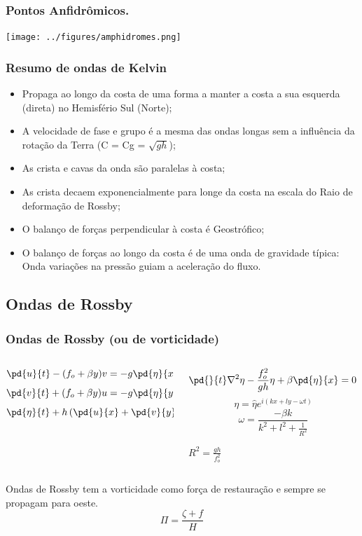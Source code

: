 \begin{frame}
  \frametitle{Pontos Anfidrômicos.}
  \begin{center}
    \texttt{[image: ../figures/amphidromes.png]}
  \end{center}
\end{frame}


\begin{frame}
  \frametitle{Resumo de ondas de Kelvin}
\small{
  \begin{itemize}[<+-| alert@+>]
  \item Propaga ao longo da costa de uma forma a manter a costa
        a sua esquerda (direta) no Hemisfério Sul (Norte);
  \item A velocidade de fase e grupo é a mesma das ondas longas
        sem a influência da rotação da Terra (C = Cg = $\sqrt{gh}$);
  \item As crista e cavas da onda são paralelas à costa;
  \item As crista decaem exponencialmente para longe da costa na escala do Raio
        de deformação de Rossby;
  \item O balanço de forças perpendicular à costa é Geostrófico;
  \item O balanço de forças ao longo da costa é de uma onda de gravidade típica:
      Onda variações na pressão guiam a aceleração do fluxo.
  \end{itemize}
}
\end{frame}


\subsection{Ondas de Rossby}
\begin{frame}
  \frametitle{Ondas de Rossby (ou de vorticidade)}
{\scriptsize
  \begin{columns}
    \begin{column}{0.5\textwidth}
    \begin{block}{}
      \[
        \pd{u}{t} - (f_o + \beta y)v = - g\pd{\eta}{x}
      \]
      \[
        \pd{v}{t} + (f_o + \beta y)u = - g\pd{\eta}{y}
      \]
      \[
        \pd{\eta}{t} + h\left(\pd{u}{x} + \pd{v}{y}\right)= 0
      \]
    \end{block}
    \end{column}
    \begin{column}{0.5\textwidth}
    \begin{block}{}
      \[
        \pd{}{t}\nabla^2\eta - \frac{f_o^2}{gh}\eta + \beta\pd{\eta}{x} = 0\text{ onde,}
      \]
      \[
        \eta = \hat{\eta}e^{i(kx + ly -\omega t)}
      \]
      \[
        \omega = \frac{-\beta k}{k^2 + l^2 + \frac{1}{R^2}}
      \]

      $R^2 = \frac{gh}{f_o^2}$
    \end{block}
    \end{column}
  \end{columns}
}
\vspace{0.5cm}
\pause
{\small Ondas de Rossby tem a vorticidade como força de restauração e sempre se
        propagam para oeste.}
\[
  \Pi = \frac{\zeta + f}{H}
\]

\end{frame}

